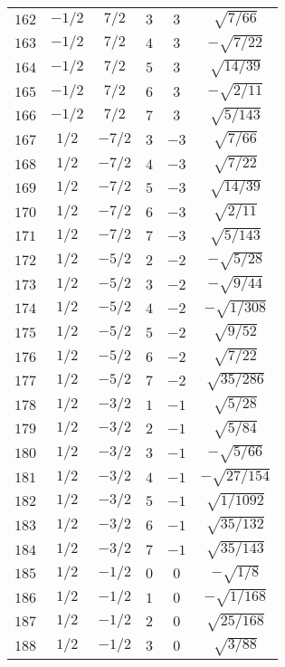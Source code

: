\begin{table}
\begin{center}
\begin{tabular}{|c|c|c|c|c|c|}
$162$ & $-1/2$ & $7/2$ & $3$ & $3$ & $\sqrt{7/66}$ \\ 
$163$ & $-1/2$ & $7/2$ & $4$ & $3$ & $-\sqrt{7/22}$ \\ 
$164$ & $-1/2$ & $7/2$ & $5$ & $3$ & $\sqrt{14/39}$ \\ 
$165$ & $-1/2$ & $7/2$ & $6$ & $3$ & $-\sqrt{2/11}$ \\ 
$166$ & $-1/2$ & $7/2$ & $7$ & $3$ & $\sqrt{5/143}$ \\ 
$167$ & $1/2$ & $-7/2$ & $3$ & $-3$ & $\sqrt{7/66}$ \\ 
$168$ & $1/2$ & $-7/2$ & $4$ & $-3$ & $\sqrt{7/22}$ \\ 
$169$ & $1/2$ & $-7/2$ & $5$ & $-3$ & $\sqrt{14/39}$ \\ 
$170$ & $1/2$ & $-7/2$ & $6$ & $-3$ & $\sqrt{2/11}$ \\ 
$171$ & $1/2$ & $-7/2$ & $7$ & $-3$ & $\sqrt{5/143}$ \\ 
$172$ & $1/2$ & $-5/2$ & $2$ & $-2$ & $-\sqrt{5/28}$ \\ 
$173$ & $1/2$ & $-5/2$ & $3$ & $-2$ & $-\sqrt{9/44}$ \\ 
$174$ & $1/2$ & $-5/2$ & $4$ & $-2$ & $-\sqrt{1/308}$ \\ 
$175$ & $1/2$ & $-5/2$ & $5$ & $-2$ & $\sqrt{9/52}$ \\ 
$176$ & $1/2$ & $-5/2$ & $6$ & $-2$ & $\sqrt{7/22}$ \\ 
$177$ & $1/2$ & $-5/2$ & $7$ & $-2$ & $\sqrt{35/286}$ \\ 
$178$ & $1/2$ & $-3/2$ & $1$ & $-1$ & $\sqrt{5/28}$ \\ 
$179$ & $1/2$ & $-3/2$ & $2$ & $-1$ & $\sqrt{5/84}$ \\ 
$180$ & $1/2$ & $-3/2$ & $3$ & $-1$ & $-\sqrt{5/66}$ \\ 
$181$ & $1/2$ & $-3/2$ & $4$ & $-1$ & $-\sqrt{27/154}$ \\ 
$182$ & $1/2$ & $-3/2$ & $5$ & $-1$ & $\sqrt{1/1092}$ \\ 
$183$ & $1/2$ & $-3/2$ & $6$ & $-1$ & $\sqrt{35/132}$ \\ 
$184$ & $1/2$ & $-3/2$ & $7$ & $-1$ & $\sqrt{35/143}$ \\ 
$185$ & $1/2$ & $-1/2$ & $0$ & $0$ & $-\sqrt{1/8}$ \\ 
$186$ & $1/2$ & $-1/2$ & $1$ & $0$ & $-\sqrt{1/168}$ \\ 
$187$ & $1/2$ & $-1/2$ & $2$ & $0$ & $\sqrt{25/168}$ \\ 
$188$ & $1/2$ & $-1/2$ & $3$ & $0$ & $\sqrt{3/88}$ \\ 

\end{tabular}
\end{center}
\end{table}
